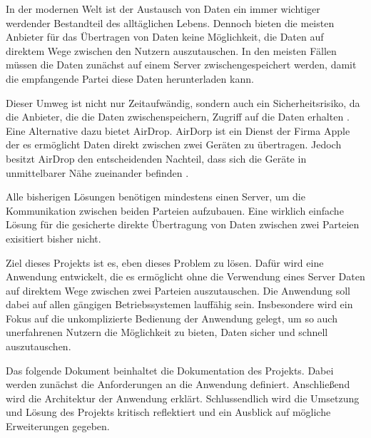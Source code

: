 In der modernen Welt ist der Austausch von Daten ein immer wichtiger werdender Bestandteil des alltäglichen Lebens. Dennoch bieten die meisten Anbieter für das Übertragen von Daten keine Möglichkeit, die Daten auf direktem Wege zwischen den Nutzern auszutauschen. In den meisten Fällen müssen die Daten zunächst auf einem Server zwischengespeichert werden, damit die empfangende Partei diese Daten herunterladen kann.

Dieser Umweg ist nicht nur Zeitaufwändig, sondern auch ein Sicherheitsrisiko, da die Anbieter, die die Daten zwischenspeichern, Zugriff auf die Daten erhalten \cite{bsi-cloud}. Eine Alternative dazu bietet AirDrop. AirDorp ist ein Dienst der Firma Apple der es ermöglicht Daten direkt zwischen zwei Geräten zu übertragen. Jedoch besitzt AirDrop den entscheidenden Nachteil, dass sich die Geräte in unmittelbarer Nähe zueinander befinden \cite{apple-airdrop}.

Alle bisherigen Lösungen benötigen mindestens einen Server, um die Kommunikation zwischen beiden Parteien aufzubauen. Eine wirklich einfache Lösung für die gesicherte direkte Übertragung von Daten zwischen zwei Parteien exisitiert bisher nicht.

Ziel dieses Projekts ist es, eben dieses Problem zu lösen. Dafür wird eine Anwendung entwickelt, die es ermöglicht ohne die Verwendung eines Server Daten auf direktem Wege zwischen zwei Parteien auszutauschen. Die Anwendung soll dabei auf allen gängigen Betriebssystemen lauffähig sein. Insbesondere wird ein Fokus auf die unkomplizierte Bedienung der Anwendung gelegt, um so auch unerfahrenen Nutzern die Möglichkeit zu bieten, Daten sicher und schnell auszutauschen.

Das folgende Dokument beinhaltet die Dokumentation des Projekts. Dabei werden zunächst die Anforderungen an die Anwendung definiert. Anschließend wird die Architektur der Anwendung erklärt. Schlussendlich wird die Umsetzung und Lösung des Projekts kritisch reflektiert und ein Ausblick auf mögliche Erweiterungen gegeben.